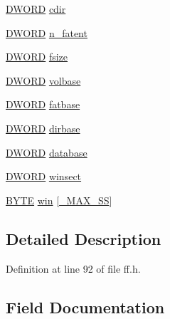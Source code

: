 \begin{DoxyCompactItemize}
\item 
\hyperlink{integer_8h_ad342ac907eb044443153a22f964bf0af}{D\+W\+O\+RD} \hyperlink{structFATFS_a217d0ce0c8cec84aa7f0c142679412c6}{cdir}
\item 
\hyperlink{integer_8h_ad342ac907eb044443153a22f964bf0af}{D\+W\+O\+RD} \hyperlink{structFATFS_a8da50eeba6469bc20d60ca0cf9a1307c}{n\+\_\+fatent}
\item 
\hyperlink{integer_8h_ad342ac907eb044443153a22f964bf0af}{D\+W\+O\+RD} \hyperlink{structFATFS_a53e9560659f14e66f306c2c444198bf3}{fsize}
\item 
\hyperlink{integer_8h_ad342ac907eb044443153a22f964bf0af}{D\+W\+O\+RD} \hyperlink{structFATFS_a8f0ca578755749d204f59dc83f1a7649}{volbase}
\item 
\hyperlink{integer_8h_ad342ac907eb044443153a22f964bf0af}{D\+W\+O\+RD} \hyperlink{structFATFS_a848fba02c4aabe02ef2984e578f33d64}{fatbase}
\item 
\hyperlink{integer_8h_ad342ac907eb044443153a22f964bf0af}{D\+W\+O\+RD} \hyperlink{structFATFS_a3f72fd998dbcce4652a85a81fe944bc4}{dirbase}
\item 
\hyperlink{integer_8h_ad342ac907eb044443153a22f964bf0af}{D\+W\+O\+RD} \hyperlink{structFATFS_a5b6c0bc2e9fd2ae8ef714210a74a2d5d}{database}
\item 
\hyperlink{integer_8h_ad342ac907eb044443153a22f964bf0af}{D\+W\+O\+RD} \hyperlink{structFATFS_ac60e69c00e6bf7c25febfbac4dc1476b}{winsect}
\item 
\hyperlink{integer_8h_a4ae1dab0fb4b072a66584546209e7d58}{B\+Y\+TE} \hyperlink{structFATFS_a7cc35a593465e727ab87723c14610644}{win} \mbox{[}\hyperlink{ffconf_8h_ac271b697378912f17132cb9c7d0de024}{\+\_\+\+M\+A\+X\+\_\+\+SS}\mbox{]}
\end{DoxyCompactItemize}


\subsection{Detailed Description}


Definition at line 92 of file ff.\+h.



\subsection{Field Documentation}
\mbox{\label{structFATFS_a217d0ce0c8cec84aa7f0c142679412c6}} 
